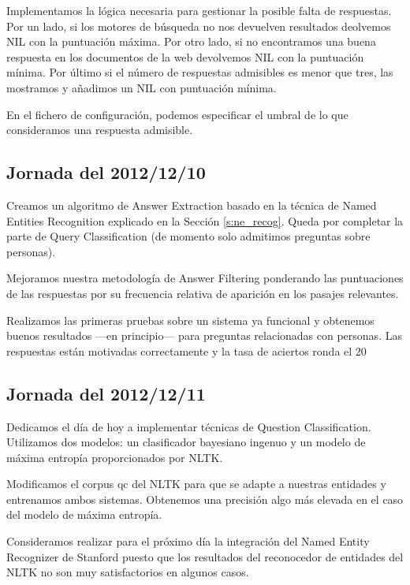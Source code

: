 \documentclass[12pt,a4paper,titlepage]{article}
\begin{document}
Implementamos la lógica necesaria para gestionar la posible falta de respuestas. Por un lado, si los motores de búsqueda no nos devuelven resultados deolvemos NIL con la puntuación máxima. Por otro lado, si no encontramos una buena respuesta en los documentos de la web devolvemos NIL con la puntuación mínima. Por último si el número de respuestas admisibles es menor que tres, las mostramos y añadimos un NIL con puntuación mínima.

En el fichero de configuración, podemos especificar el umbral de lo que consideramos una respuesta admisible.

\subsection{Jornada del 2012/12/10}
Creamos un algoritmo de Answer Extraction basado en la técnica de Named Entities Recognition explicado en la Sección \ref{s:ne_recog}. Queda por completar la parte de Query Classification (de momento solo admitimos preguntas sobre personas).

Mejoramos nuestra metodología de Answer Filtering ponderando las puntuaciones de las respuestas por su frecuencia relativa de aparición en los pasajes relevantes.

Realizamos las primeras pruebas sobre un sistema ya funcional y obtenemos buenos resultados ---en principio--- para preguntas relacionadas con personas. Las respuestas están motivadas correctamente y la tasa de aciertos ronda el 20\\%

\subsection{Jornada del 2012/12/11}
Dedicamos el día de hoy a implementar técnicas de Question Classification. Utilizamos dos modelos: un clasificador bayesiano ingenuo y un modelo de máxima entropía proporcionados por NLTK.

Modificamos el corpus qc del NLTK para que se adapte a nuestras entidades y entrenamos ambos sistemas. Obtenemos una precisión algo más elevada en el caso del modelo de máxima entropía.

Consideramos realizar para el próximo día la integración del Named Entity Recognizer de Stanford puesto que los resultados del reconocedor de entidades del NLTK no son muy satisfactorios en algunos casos.
\end{document}
